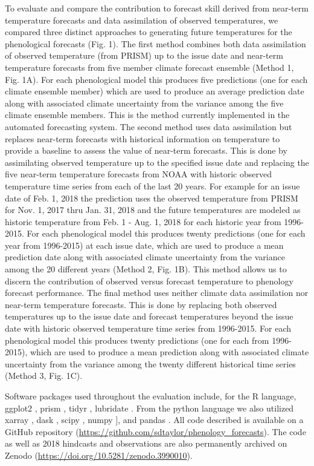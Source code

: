 \documentclass[fleqn,10pt,lineno]{wlpeerj}
\begin{document}
To evaluate and compare the contribution to forecast skill derived from near-term temperature forecasts and data assimilation of observed temperatures, we compared three distinct approaches to generating future temperatures for the phenological forecasts (Fig. 1). The first method combines both data assimilation of observed temperature (from PRISM) up to the issue date and near-term temperature forecasts from five member climate forecast ensemble (Method 1, Fig. 1A). For each phenological model this produces five predictions (one for each climate ensemble member) which are used to produce an average prediction date along with associated climate uncertainty from the variance among the five climate ensemble members. This is the method currently implemented in the automated forecasting system. The second method uses data assimilation but replaces near-term forecasts with historical information on temperature to provide a baseline to assess the value of near-term forecasts. This is done by assimilating observed temperature up to the specified issue date and replacing the five near-term temperature forecasts from NOAA with historic observed temperature time series from each of the last 20 years. For example for an issue date of Feb. 1, 2018 the prediction uses the observed temperature from PRISM for Nov. 1, 2017 thru Jan. 31, 2018 and the future temperatures are modeled as historic temperature from Feb. 1 - Aug. 1, 2018 for each historic year from 1996-2015. For each phenological model this produces twenty predictions (one for each year from 1996-2015) at each issue date, which are used to produce a mean prediction date along with associated climate uncertainty from the variance among the 20 different years (Method 2, Fig. 1B). This method allows us to discern the contribution of observed versus forecast temperature to phenology forecast performance. The final method uses neither climate data assimilation nor near-term temperature forecasts. This is done by replacing both observed temperatures up to the issue date and forecast temperatures beyond the issue date with historic observed temperature time series from 1996-2015. For each phenological model this produces twenty predictions (one for each from 1996-2015), which are used to produce a mean prediction along with associated climate uncertainty from the variance among the twenty different historical time series (Method 3, Fig. 1C).

Software packages used throughout the evaluation include, for the R language, ggplot2 \citep{ggplot2} , prism \citep{prismR}, tidyr \citep{tidyr}, lubridate \citep{lubridate}. From the python language we also utilized xarray \citep{xarray}, dask \citep{dask}, scipy \citep{scipy2020}, numpy \citep{numpy}], and pandas \citep{pandas}. All code described is available on a GitHub repository (\url{https://github.com/sdtaylor/phenology\_forecasts}). The code as well as 2018 hindcasts and observations are also permanently archived on Zenodo (\url{https://doi.org/10.5281/zenodo.3990010}).
\end{document}
